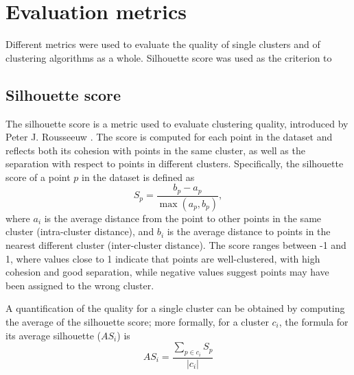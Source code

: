 \section{Evaluation metrics}
Different metrics were used to evaluate the quality of single clusters and of clustering algorithms as a whole. Silhouette score was used as the criterion to 

\subsection{Silhouette score}
The silhouette score is a metric used to evaluate clustering quality, introduced by Peter J. Rousseeuw \cite{Rousseeuw1987}. The score is computed for each point in the dataset and reflects both its cohesion with points in the same cluster, as well as the separation with respect to points in different clusters. Specifically, the silhouette score of a point $p$ in the dataset is defined as 
\begin{equation}
  \label{eqn:silhouette}
  S_{p} = \frac{b_{p} - a_{p}}{\max({a_{p}, b_{p}})},
\end{equation}
where $a_{i}$ is the average distance from the point to other points in the same cluster (intra-cluster distance), and $b_{i}$ is the average distance to points in the nearest different cluster (inter-cluster distance). The score ranges between -1 and 1, where values close to 1 indicate that points are well-clustered, with high cohesion and good separation, while negative values suggest points may have been assigned to the wrong cluster. 

A quantification of the quality for a single cluster can be obtained by computing the average of the silhouette score; more formally, for a cluster $c_{i}$, the formula for its average silhouette ($AS_{i}$) is 
\begin{equation}
  \label{eqn:cluster_silhouette}
  AS_{i} = \frac{\sum_{p \in c_{i}} S_{p}}{|c_{i}|}
\end{equation}

